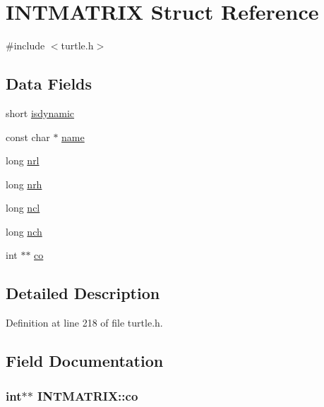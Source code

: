 \hypertarget{struct_i_n_t_m_a_t_r_i_x}{\section{I\-N\-T\-M\-A\-T\-R\-I\-X Struct Reference}
\label{struct_i_n_t_m_a_t_r_i_x}
}


{\ttfamily \#include $<$turtle.\-h$>$}

\subsection*{Data Fields}
\begin{DoxyCompactItemize}
\item 
short \hyperlink{struct_i_n_t_m_a_t_r_i_x_a6f5ac0466cac944ab323b6f98a149997}{isdynamic}
\item 
const char $\ast$ \hyperlink{struct_i_n_t_m_a_t_r_i_x_aaf60899cd1765633c636c834239d2f0e}{name}
\item 
long \hyperlink{struct_i_n_t_m_a_t_r_i_x_a51a4582cb062b29575f2fad7f741650a}{nrl}
\item 
long \hyperlink{struct_i_n_t_m_a_t_r_i_x_a41cb525037b6cc968939a441b36fcbde}{nrh}
\item 
long \hyperlink{struct_i_n_t_m_a_t_r_i_x_a6aeab0238a62dd0f7ca4a9d883d71da5}{ncl}
\item 
long \hyperlink{struct_i_n_t_m_a_t_r_i_x_a265642b24193f73afb7eb0886b5ccd48}{nch}
\item 
int $\ast$$\ast$ \hyperlink{struct_i_n_t_m_a_t_r_i_x_a87621a5ffd25a3741284fe4c7180ab28}{co}
\end{DoxyCompactItemize}


\subsection{Detailed Description}


Definition at line 218 of file turtle.\-h.



\subsection{Field Documentation}
\hypertarget{struct_i_n_t_m_a_t_r_i_x_a87621a5ffd25a3741284fe4c7180ab28}{
\subsubsection[{co}]{\setlength{\rightskip}{0pt plus 5cm}int$\ast$$\ast$ I\-N\-T\-M\-A\-T\-R\-I\-X\-::co}}\label{struct_i_n_t_m_a_t_r_i_x_a87621a5ffd25a3741284fe4c7180ab28}



